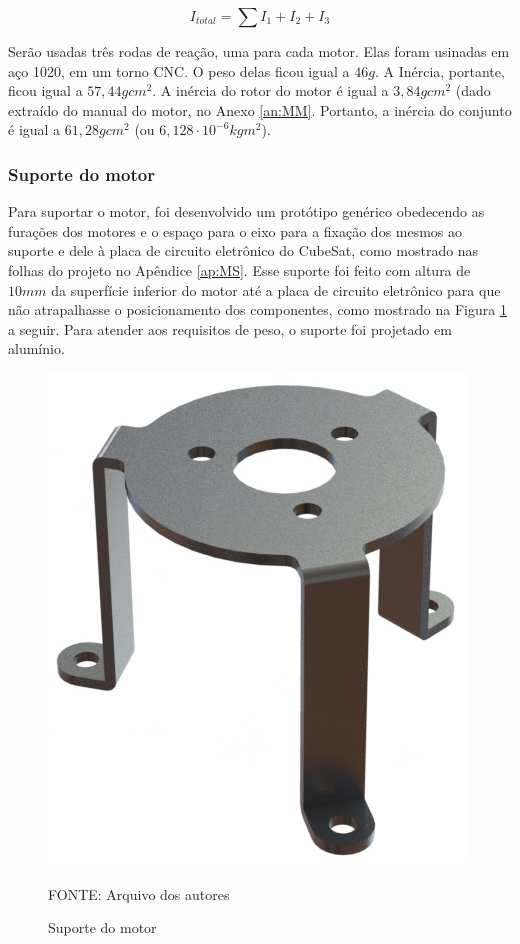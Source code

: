 \documentclass[
	12pt,				%
	openany,			%
	twoside,			%
	a4paper,			%
	english,			%
	french,				%
	spanish,			%
	brazil,				%
	oldfontcommands
	]{abntex2}
\begin{document}
\begin{equation}
I_{total} = \sum\nolimits I_{1} + I_{2} + I_{3}
\label{eq:Inetot}
\end{equation}

Serão usadas três rodas de reação, uma para cada motor. Elas foram usinadas em aço 1020, em um torno CNC. O peso delas ficou igual a $46g$. A Inércia, portante, ficou igual a $57,44gcm^{2}$. A inércia do rotor do motor é igual a $3,84gcm^{2}$ (dado extraído do manual do motor, no Anexo \ref{an:MM}. Portanto, a inércia do conjunto é igual a $61,28gcm^{2}$ (ou $6,128 \cdot 10^{-6}kgm^{2}$).

\subsubsection{Suporte do motor}

Para suportar o motor, foi desenvolvido um protótipo genérico obedecendo as furações dos motores e o espaço para o eixo para a fixação dos mesmos ao suporte e dele à placa de circuito eletrônico do CubeSat, como mostrado nas folhas do projeto no Apêndice \ref{ap:MS}. Esse suporte foi feito com altura de $10mm$ da superfície inferior do motor até a placa de circuito eletrônico para que não atrapalhasse o posicionamento dos componentes, como mostrado na Figura \ref{fig:MS} a seguir. Para atender aos requisitos de peso, o suporte foi projetado em alumínio.

\begin{figure}[th]
	\caption{Suporte do motor}
	\centering
	\includegraphics[width=0.5\linewidth]{./figs/Motor_Sup}
	
	\begin{small}
		FONTE: Arquivo dos autores
	\end{small}
	\label{fig:MS}
\end{figure}
\end{document}
